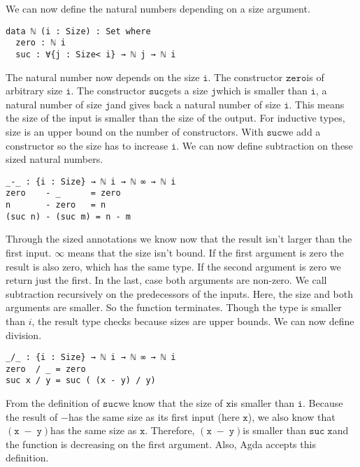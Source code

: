 \documentclass[a4paper,cleardoubleempty,BCOR1cm]{scrbook}
\begin{document}
We can now define the natural numbers depending on a size argument.
\begin{verbatim}
data ℕ (i : Size) : Set where
  zero : ℕ i
  suc : ∀{j : Size< i} → ℕ j → ℕ i
\end{verbatim}
The natural number now depends on the size $\mathtt{i}$.  The constructor $\mathtt{zero}$\;is of
arbitrary size $\mathtt{i}$.  The constructor $\mathtt{suc}$\;gets a size $\mathtt{j}$\;which is smaller than $\mathtt{i}$, a
natural number of size $\mathtt{j}$\;and gives back a natural number of size $\mathtt{i}$.  This
means the size of the input is smaller than the size of the output.  For
inductive types, size is an upper bound on the number of constructors.  With
$\mathtt{suc}$\;we add a constructor so the size has to increase  $\mathtt{i}$.  We can now define
subtraction on these sized natural numbers.
\begin{verbatim}
_-_ : {i : Size} → ℕ i → ℕ ∞ → ℕ i
zero    - _      = zero
n       - zero   = n
(suc n) - (suc m) = n - m
\end{verbatim}
Through the sized annotations we know now that the result isn't larger than
the first input.  \(\infty\) means that the size isn't bound.  If the first
argument is zero the result is also zero, which has the same type.  If the
second argument is zero we return just the first.  In the last, case both
arguments are non-zero.  We call subtraction recursively on the predecessors
of the inputs.  Here, the size and both arguments are smaller.  So the
function terminates.  Though the type is smaller than \(i\), the result type
checks because sizes are upper bounds.  We can now define division.
\begin{verbatim}
_/_ : {i : Size} → ℕ i → ℕ ∞ → ℕ i
zero  / _ = zero
suc x / y = suc ( (x - y) / y)
\end{verbatim}
From the definition of $\mathtt{suc}$\;we know that the size of $\mathtt{x}$\;is smaller than $\mathtt{i}$.
Because the result of $\mathtt{-}$\;has the same size as its first input (here $\mathtt{x}$),
we also know that $\mathtt{(x\;-\;y)}$\;has the same size as $\mathtt{x}$. Therefore, $\mathtt{(x\;-\;y)}$\;is
smaller than $\mathtt{suc\;x}$\;and the function is decreasing on the first argument.
Also, Agda accepts this definition.
\end{document}

